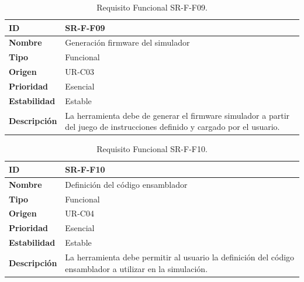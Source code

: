 \begin{center}
\begin{table}[htbp]
\centering
\begin{tabular}{@{}p{2.5cm} p{9cm}@{}} 
\toprule
\textbf{ID} 				& SR-F-F09 \\
\midrule
\textbf{Nombre} 			& Generación firmware del simulador\\
\midrule
\textbf{Tipo} 			& Funcional \\
\midrule
\textbf{Origen} 			& UR-C03 \\
\midrule
\textbf{Prioridad}		& Esencial \\
\midrule
\textbf{Estabilidad} 		& Estable \\
\midrule
\textbf{Descripción} 	& La herramienta debe de generar el firmware simulador a partir del juego de instrucciones definido y cargado por el usuario. \\
\bottomrule
\end{tabular}
\caption{Requisito Funcional SR-F-F09.}
\label{tab:srff09}
\end{table}
\end{center}

\begin{center}
\begin{table}[htbp]
\centering
\begin{tabular}{@{}p{2.5cm} p{9cm}@{}} 
\toprule
\textbf{ID} 				& SR-F-F10 \\
\midrule
\textbf{Nombre} 			& Definición del código ensamblador\\
\midrule
\textbf{Tipo} 			& Funcional \\
\midrule
\textbf{Origen} 			& UR-C04 \\
\midrule
\textbf{Prioridad}		& Esencial \\
\midrule
\textbf{Estabilidad} 		& Estable \\
\midrule
\textbf{Descripción} 	& La herramienta debe permitir al usuario la definición del código ensamblador a utilizar en la simulación. \\
\bottomrule
\end{tabular}
\caption{Requisito Funcional SR-F-F10.}
\label{tab:srff10}
\end{table}
\end{center}

